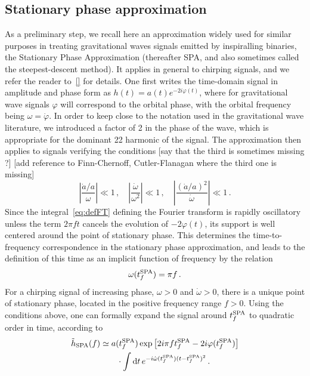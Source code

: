 \documentclass[aps,showpacs,twocolumn,
prd,superscriptaddress,nofootinbib]{revtex4-1}
\newcommand{\be}{\begin{equation}}
\newcommand{\ee}{\end{equation}}
\newcommand\ud{{\mathrm{d}}}
\newcommand{\nn}{\nonumber}
\newcommand{\tfSPA}{t_{f}^{\rm SPA}}
\newcommand{\SM}[1]{{\color{Red} #1}}
\begin{document}

\subsection{Stationary phase approximation}
\label{subsec:SPA}

As a preliminary step, we recall here an approximation widely used for similar purposes in treating gravitational waves signals emitted by inspiralling binaries, the Stationary Phase Approximation (thereafter SPA, and also sometimes called the steepest-descent method). It applies in general to chirping signals, and we refer the reader to~\ref{} for details. One first writes the time-domain signal in amplitude and phase form as $h(t) = a(t) e^{-2i\varphi(t)}$, where for gravitational wave signals $\varphi$ will correspond to the orbital phase, with the orbital frequency being $\omega = \dot{\varphi}$. In order to keep close to the notation used in the gravitational wave literature, we introduced a factor of 2 in the phase of the wave, which is appropriate for the dominant 22 harmonic of the signal. The approximation then applies to signals verifying the conditions \SM{[say that the third is sometimes missing ?]} \SM{[add reference to Finn-Chernoff, Cutler-Flanagan where the third one is missing]}
\be\label{eq:conditionsSPA}
	\left| \frac{\dot{a}/a}{\omega} \right| \ll 1\,, \quad \left|\frac{\dot{\omega}}{\omega^{2}} \right| \ll 1\,, \quad \left| \frac{(\dot{a}/a)^{2}}{\dot{\omega}} \right| \ll 1 \,.
\ee
Since the integral~\eqref{eq:defFT} defining the Fourier transform is rapidly oscillatory unless the term $2\pi f t$ cancels the evolution of $-2\varphi(t)$, its support is well centered around the point of stationary phase. This determines the time-to-frequency correspondence in the stationary phase approximation, and leads to the definition of this time as an implicit function of frequency by the relation
\be\label{eq:deftfSPA}
	\omega(\tfSPA) = \pi  f \,.
\ee
For a chirping signal of increasing phase, $\omega>0$ and $\dot{\omega}>0$, there is a unique point of stationary phase, located in the positive frequency range $f>0$. Using the conditions above, one can formally expand the signal around $\tfSPA$ to quadratic order in time, according to
\begin{align}
	\tilde{h}_{\rm SPA} (f) &\simeq a(\tfSPA) \exp\left[2i\pi f \tfSPA-2i\varphi(\tfSPA) \right] \nn\\
	& \qquad \cdot \int \ud t \, e^{-i \dot{\omega} (\tfSPA) (t-\tfSPA)^{2}} \,.
\end{align}
\end{document}
